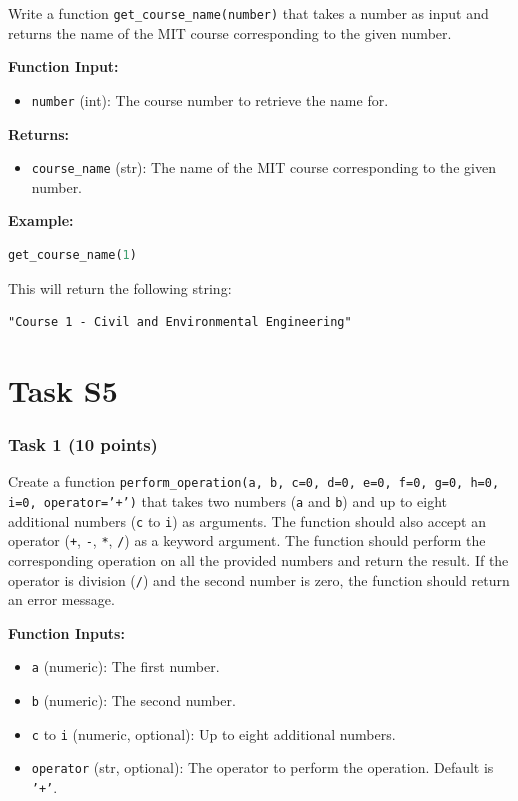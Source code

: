 \documentclass[12pt]{book}
\begin{document}
Write a function \texttt{get\_course\_name(number)} that takes a number as input and returns the name of the MIT course corresponding to the given number.

\textbf{Function Input:}
\begin{itemize}
\item \texttt{number} (int): The course number to retrieve the name for.
\end{itemize}

\textbf{Returns:}
\begin{itemize}
\item \texttt{course\_name} (str): The name of the MIT course corresponding to the given number.
\end{itemize}

\textbf{Example:}
\begin{lstlisting}[language=Python]
get_course_name(1)
\end{lstlisting}
This will return the following string:
\begin{verbatim}
"Course 1 - Civil and Environmental Engineering"
\end{verbatim}
\newpage
\section{Task S5}

\subsubsection{Task 1 (10 points)}
Create a function \texttt{perform\_operation(a, b, c=0, d=0, e=0, f=0, g=0, h=0, i=0, operator='+')} that takes two numbers (\texttt{a} and \texttt{b}) and up to eight additional numbers (\texttt{c} to \texttt{i}) as arguments. The function should also accept an operator (\texttt{+}, \texttt{-}, \texttt{*}, \texttt{/}) as a keyword argument. The function should perform the corresponding operation on all the provided numbers and return the result. If the operator is division (\texttt{/}) and the second number is zero, the function should return an error message.

\textbf{Function Inputs:}
\begin{itemize}
\item \texttt{a} (numeric): The first number.
\item \texttt{b} (numeric): The second number.
\item \texttt{c} to \texttt{i} (numeric, optional): Up to eight additional numbers.
\item \texttt{operator} (str, optional): The operator to perform the operation. Default is \texttt{'+'}.
\end{itemize}
\end{document}
